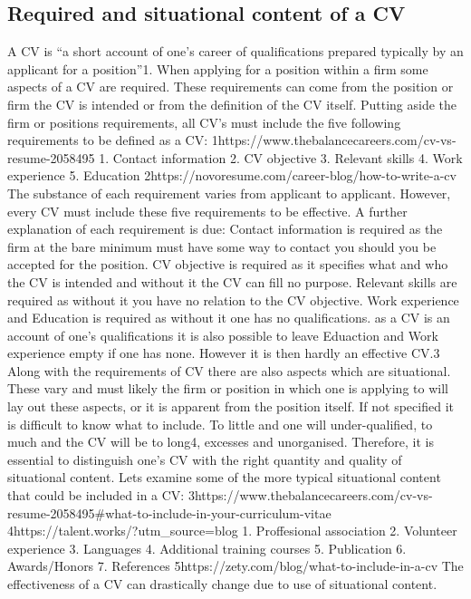 \subsection{Required and situational content of a CV}
A CV  is “a short account of one’s career of qualifications prepared typically by an applicant for a position”1.
When applying for a position within a firm some aspects of a CV are required. 
These requirements can come from the position or firm the CV is intended or from the definition of the CV itself.
Putting aside the firm or positions requirements, all CV’s must include the five following requirements to be defined as a CV:
1https://www.thebalancecareers.com/cv-vs-resume-2058495
1. Contact information
2. CV objective
3. Relevant skills
4. Work experience
5. Education
2https://novoresume.com/career-blog/how-to-write-a-cv
The substance of each requirement varies from applicant to applicant. However, every CV must include these five requirements to be effective. 
A further explanation of each requirement is due:
Contact information is required as the firm at the bare minimum must have some way to contact you should you be accepted for the position. 
CV objective is required as it specifies what and who the CV is intended and without it the CV can fill no purpose. 
Relevant skills are required as without it you have no relation to the CV objective. 
Work experience and Education is required as without it one has no qualifications.
as a CV is an account of one’s qualifications it is also possible to leave Eduaction and Work experience empty if one has none. 
However it is then hardly an effective CV.3
Along with the requirements of CV there are also aspects which are situational. 
These vary and must likely the firm or position in which one is applying to will lay out these aspects, or it is apparent from the position itself.
If not specified it is difficult to know what to include. To little and one will under-qualified, to much and the CV will be to long4, excesses and unorganised. 
Therefore, it is essential to distinguish one’s CV with the right quantity and quality of situational content.
Lets examine some of the more typical situational content that could be included in a CV:
3https://www.thebalancecareers.com/cv-vs-resume-2058495#what-to-include-in-your-curriculum-vitae
4https://talent.works/?utm_source=blog
1. Proffesional association
2. Volunteer experience 
3. Languages
4. Additional training courses 
5. Publication
6. Awards/Honors
7. References
5https://zety.com/blog/what-to-include-in-a-cv
The effectiveness of a CV can drastically change due to use of situational content.
